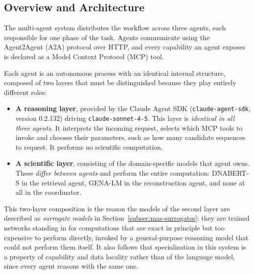 \subsection{Overview and Architecture}
\label{subsec:mas-architecture}

The multi-agent system distributes the workflow across three agents, each responsible for
one phase of the task. Agents communicate using the Agent2Agent (A2A) protocol over HTTP,
and every capability an agent exposes is declared as a Model Context Protocol (MCP) tool.

Each agent is an autonomous process with an identical internal structure, composed of two
layers that must be distinguished because they play entirely different roles:

\begin{itemize}
    \item \textbf{A reasoning layer}, provided by the Claude Agent SDK
    (\texttt{claude-agent-sdk}, version 0.2.132) driving \texttt{claude-sonnet-4-5}. This
    layer is \textit{identical in all three agents}. It interprets the incoming request,
    selects which MCP tools to invoke and chooses their parameters, such as how many
    candidate sequences to request. It performs no scientific computation.

    \item \textbf{A scientific layer}, consisting of the domain-specific models that agent
    owns. These \textit{differ between agents} and perform the entire computation:
    DNABERT-S in the retrieval agent, GENA-LM in the reconstruction agent, and none at all
    in the coordinator.
\end{itemize}

This two-layer composition is the reason the models of the second layer are described as
\textit{surrogate models} in Section~\ref{subsec:mas-surrogates}: they are trained networks
standing in for computations that are exact in principle but too expensive to perform
directly, invoked by a general-purpose reasoning model that could not perform them itself.
It also follows that specialization in this system is a property of capability and data
locality rather than of the language model, since every agent reasons with the same one.

